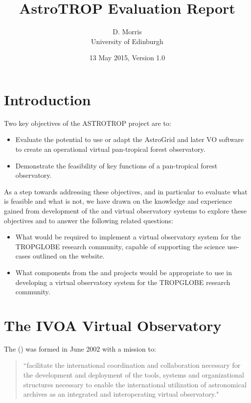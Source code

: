 \documentclass{article}
\title{AstroTROP Evaluation Report}
\author{D. Morris \\
University of Edinburgh}
\date{13 May 2015, Version 1.0}
\begin{document}
\maketitle

\section{Introduction}

Two key objectives of the ASTROTROP project are to:
\begin{itemize}
    \item Evaluate the potential to use or adapt the AstroGrid and later VO
    software to create an operational virtual pan-tropical forest observatory.
    \item Demonstrate the feasibility of key functions of a pan-tropical
    forest observatory.
\end{itemize}

As a step towards addressing these objectives, and in particular to
evaluate what is feasible and what is not, we have drawn on the knowledge
and experience gained from development of the \cite{astro} and \cite{ivoa}
virtual observatory systems to explore these objectives and to answer the
following related questions:

\begin{itemize}
    \item What would be required to implement a virtual observatory system
    for the TROPGLOBE research community, capable of supporting the science
    use-cases outlined on the \cite{atrop} website.
    \item What components from the \cite{astro} and \cite{ivoa} projects
    would be appropriate to use in developing a virtual observatory system
    for the TROPGLOBE research community.
\end{itemize}

\section{The IVOA Virtual Observatory}

The  (\cite{ivoa}) was formed in June 2002 with a mission to:
\begin{quote}
``facilitate the international coordination and collaboration necessary for
the development and deployment of the tools, systems and organizational
structures necessary to enable the international utilization of astronomical
archives as an integrated and interoperating virtual observatory."
\end{quote}
\end{document}
